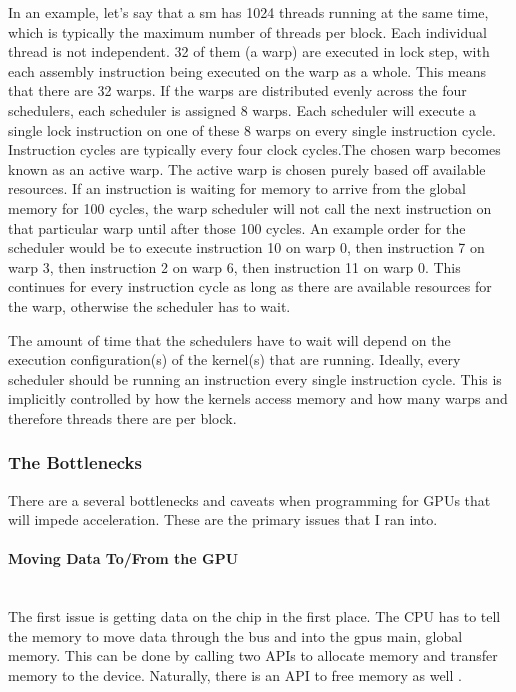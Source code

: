 In an example, let's say that a \gls{sm} has 1024 threads running at the same time, which is typically the maximum number of threads per block. Each individual thread is not independent. 32 of them (a warp) are executed in lock step, with each assembly instruction being executed on the warp as a whole. This means that there are 32 warps. If the warps are distributed evenly across the four schedulers, each scheduler is assigned 8 warps. Each scheduler will execute a single lock instruction on one of these 8 warps on every single instruction cycle. Instruction cycles are typically every four clock cycles.The chosen warp becomes known as an active warp. The active warp is chosen purely based off available resources. If an instruction is waiting for memory to arrive from the global memory for 100 cycles, the warp scheduler will not call the next instruction on that particular warp until after those 100 cycles. An example order for the scheduler would be to execute instruction 10 on warp 0, then instruction 7 on warp 3, then instruction 2 on warp 6, then instruction 11 on warp 0. This continues for every instruction cycle as long as there are available resources for the warp, otherwise the scheduler has to wait. 

The amount of time that the schedulers have to wait will depend on the execution configuration(s) of the kernel(s) that are running. Ideally, every scheduler should be running an instruction every single instruction cycle. This is implicitly controlled by how the kernels access memory and how many warps and therefore threads there are per block.
\subsubsection{The Bottlenecks}
There are a several bottlenecks and caveats when programming for GPUs that will impede acceleration. These are the primary issues that I ran into.

\paragraph{Moving Data To/From the GPU} \hspace{0pt} \\
\indent The first issue is getting data on the chip in the first place. The CPU has to tell the memory to move data through the bus and into the \glspl{gpu} main, global memory. This can be done by calling two APIs to allocate memory and transfer memory to the device. Naturally, there is an API to free memory as well \citep{cudaC}.

